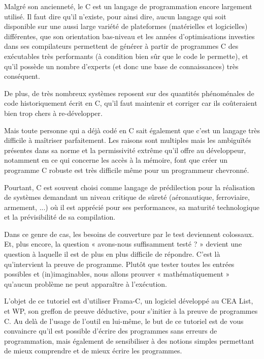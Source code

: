 \newpage


Malgré son ancienneté, le C est un langage de programmation encore largement
utilisé. Il faut dire qu'il n'existe, pour ainsi dire, aucun langage qui soit
disponible sur une aussi large variété de plateformes (matérielles et
logicielles) différentes, que son orientation bas-niveau et les années
d'optimisations investies dans ses compilateurs permettent de générer à
partir de programmes C des exécutables très performants (à condition bien sûr
que le code le permette), et qu'il possède un nombre d'experts (et donc une
base de connaissances) très conséquent.



De plus, de très nombreux systèmes reposent sur des quantités phénoménales de
code historiquement écrit en C, qu'il faut maintenir et corriger car ils
coûteraient bien trop chers à re-développer.



Mais toute personne qui a déjà codé en C sait également que c'est un langage
très difficile à maîtriser parfaitement. Les raisons sont multiples mais les
ambiguïtés présentes dans sa norme et la permissivité extrême qu'il offre au
développeur, notamment en ce qui concerne les accès à la mémoire, font que
créer un programme C robuste est très difficile même pour un programmeur
chevronné.



Pourtant, C est souvent choisi comme langage de prédilection pour la
réalisation de systèmes demandant un niveau critique de sûreté (aéronautique,
ferroviaire, armement, ...) où il est apprécié pour ses performances, sa
maturité technologique et la prévisibilité de sa compilation.



Dans ce genre de cas, les besoins de couverture par le test deviennent
colossaux. Et, plus encore, la question « avons-nous suffisamment testé ? »
devient une question à laquelle il est de plus en plus difficile de répondre.
C'est là qu'intervient la preuve de programme. Plutôt que tester toutes les
entrées possibles et (in)imaginables, nous allons prouver « mathématiquement »
qu'aucun problème ne peut apparaître à l'exécution.



L'objet de ce tutoriel est d'utiliser Frama-C, un logiciel développé au
CEA List, et WP, son greffon de preuve déductive, pour s'initier à la preuve
de programmes C. Au delà de l'usage de l'outil en lui-même, le but de ce tutoriel
est de vous convaincre qu'il est possible d'écrire des programmes sans erreurs de
programmation, mais également de sensibiliser à des notions simples
permettant de mieux comprendre et de mieux écrire les programmes.



